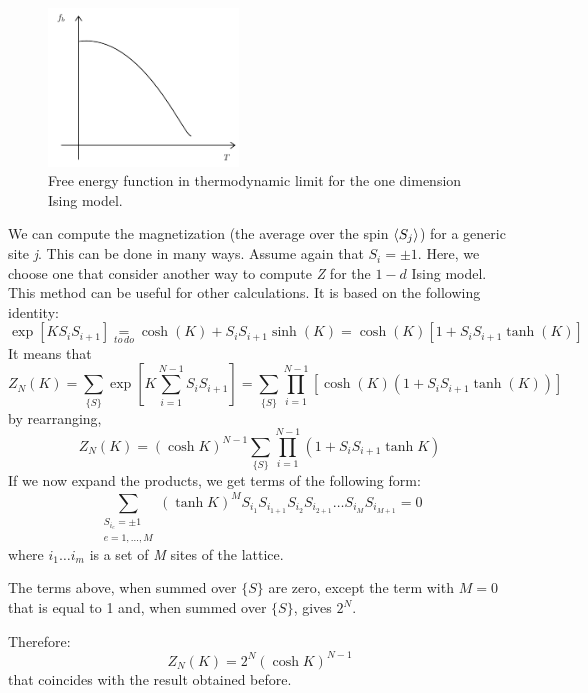 \documentclass[../main/main.tex]{subfiles}
\begin{document}
\begin{figure}[h!]
\centering
\includegraphics[width=0.45\textwidth]{../lessons/6_image/3.pdf}
\caption{\label{fig:6_3} Free energy function in thermodynamic limit for the one dimension Ising model.}
\end{figure}
We can compute the magnetization (the average over the spin \( \expval{S_j}  \)) for a generic site \emph{j}. This can be done in many ways. Assume again that \( S_i = \pm 1 \). Here, we choose one that consider another way to compute \emph{Z} for the \( 1-d \) Ising model. This method can be useful for other calculations. It is based on the following identity:
\begin{equation}
  \exp [ K S_i S_{i+1}] \underset{to\,do}{=}  \cosh ( K) + S_i S_{i+1} \sinh (K) = \cosh (K) [1+ S_i S_{i+1} \tanh (K)]
\end{equation}
It means that
\begin{equation}
  Z_N (K) = \sum_{\{ S \}  }^{}    \exp [K  \sum_{i=1}^{N-1} S_i S_{i+1}  ] = \sum_{\{ S \}  }^{}   \prod_{i=1}^{N-1} [ \cosh (K) (1+ S_i S_{i+1} \tanh (K))]
\end{equation}
by rearranging,
\begin{equation}
  Z_N (K)= (\cosh K)^{N-1} \sum_{\{S\}}^{}  \prod_{i=1}^{N-1} ( 1 + S_i S_{i+1} \tanh K )
\end{equation}
If we now expand the products, we get terms of the following form:
\begin{equation}
  \sum_{ \substack{ S_{i_e} = \pm 1\\ e= 1, \dots, M} }^{}  (\tanh K )^M S_{i_1} S_{i_{1+1}} S_{i_2} S_{i_{2+1}} \dots S_{i_M} S_{i_{M+1}} = 0
  \label{eq:6_3}
\end{equation}
where \( i_1 \dots i_m \) is a set of \emph{M} sites of the lattice.
\begin{remark}
The terms above, when summed over \( \{ S \}   \) are zero, except the term with \( M=0 \) that is equal to 1 and, when summed over \( \{ S \}   \), gives \( 2^N \).
\end{remark}
Therefore:
\begin{equation}
  Z_N (K) = 2^N (\cosh K)^{N-1}
\end{equation}
that coincides with the result obtained before.
\end{document}
